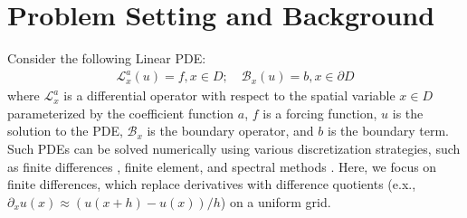 \documentclass{article} %
\begin{document}


\section{Problem Setting and Background} \label{sec:background}

Consider the following Linear PDE:
\begin{equation} \label{eq:mainpde}
    \begin{split}
    \mathcal{L}_{x}^a\left(u\right) = f ,x \in D; \quad
    \mathcal{B}_{x}\left(u\right) = b ,x \in \partial D
    \end{split}
\end{equation}
where $\mathcal{L}_x^a$ is a differential operator with respect to the spatial variable $x \in D$ parameterized by the coefficient function $a$,  $f$ is a forcing function,  $u$ is the solution to the PDE, $\mathcal{B}_{x}$ is the boundary operator, and $b$ is the boundary term. Such PDEs can be solved numerically using various discretization strategies, such as finite differences \citep{smith1985numerical,leveque2007finite}, finite element, and spectral methods \citep{boyd2001chebyshev,canuto2006spectral}. Here, we focus on finite differences, which replace derivatives with difference quotients (e.x., $\partial_x u(x) \approx (u(x + h) - u(x))/h$) on a uniform grid.
\end{document}

